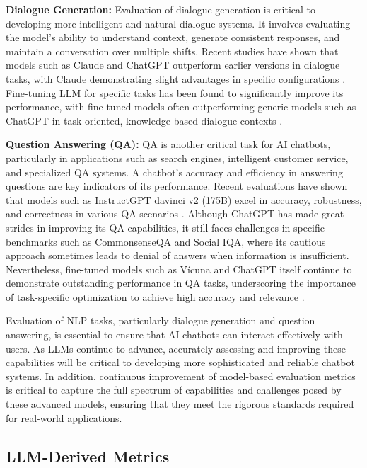 \textbf{Dialogue Generation:} Evaluation of dialogue generation is critical to developing more intelligent and natural dialogue systems. It involves evaluating the model's ability to understand context, generate consistent responses, and maintain a conversation over multiple shifts. Recent studies have shown that models such as Claude and ChatGPT outperform earlier versions in dialogue tasks, with Claude demonstrating slight advantages in specific configurations \cite{lin2023llm, qin2023chatgpt}. Fine-tuning LLM for specific tasks has been found to significantly improve its performance, with fine-tuned models often outperforming generic models such as ChatGPT in task-oriented, knowledge-based dialogue contexts \cite{bang2023multitask}.

\textbf{Question Answering (QA):} QA is another critical task for AI chatbots, particularly in applications such as search engines, intelligent customer service, and specialized QA systems. A chatbot's accuracy and efficiency in answering questions are key indicators of its performance. Recent evaluations have shown that models such as InstructGPT davinci v2 (175B) excel in accuracy, robustness, and correctness in various QA scenarios \cite{ouyang2022training, liang2022holistic}. Although ChatGPT has made great strides in improving its QA capabilities, it still faces challenges in specific benchmarks such as CommonsenseQA and Social IQA, where its cautious approach sometimes leads to denial of answers when information is insufficient. Nevertheless, fine-tuned models such as Vícuna and ChatGPT itself continue to demonstrate outstanding performance in QA tasks, underscoring the importance of task-specific optimization to achieve high accuracy and relevance \cite{bai2024benchmarking}.

Evaluation of NLP tasks, particularly dialogue generation and question answering, is essential to ensure that AI chatbots can interact effectively with users. As LLMs continue to advance, accurately assessing and improving these capabilities will be critical to developing more sophisticated and reliable chatbot systems. In addition, continuous improvement of model-based evaluation metrics is critical to capture the full spectrum of capabilities and challenges posed by these advanced models, ensuring that they meet the rigorous standards required for real-world applications.

\subsection{LLM-Derived Metrics}

